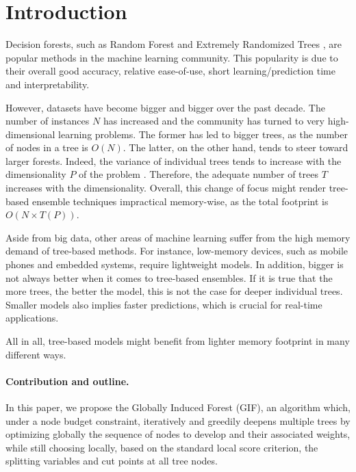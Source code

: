 \documentclass{article}
\begin{document}
\section{Introduction}
\label{sec:introduction}

Decision forests, such as Random Forest \cite{breiman2001random} and
Extremely Randomized Trees \cite{extratrees}, are popular methods in
the machine learning community. This popularity is due to their
overall good accuracy, relative ease-of-use, short learning/prediction
time and interpretability. 

However, datasets have become bigger and bigger over the past decade. The 
number of instances $N$ has increased and the community has turned to very 
high-dimensional learning problems. The former has led to bigger trees, as the 
number of nodes in a tree is $O(N)$. The latter, on the other hand, tends to 
steer toward larger forests. Indeed, the variance of individual trees tends to 
increase with the dimensionality $P$ of the problem \cite{l1basedcomp}. 
Therefore, the adequate number of trees $T$ increases with the dimensionality. 
Overall, this change of focus might render tree-based ensemble techniques 
impractical memory-wise, as the total footprint is $O(N \times T(P))$. 

Aside from big data, other areas of machine learning suffer from the
high memory demand of tree-based methods. For instance, low-memory
devices, such as mobile phones and embedded systems, require
lightweight models. In addition, bigger is not always better when it
comes to tree-based ensembles.  If it is true that the more trees, the
better the model, this is not the case for deeper individual trees.
Smaller models also implies faster predictions, which is crucial for
real-time applications.

All in all, tree-based models might benefit from lighter memory
footprint in many different ways.

\vspace*{-\baselineskip}

\paragraph{Contribution and outline.}
In this paper, we propose the Globally Induced Forest (GIF), an algorithm 
which, under a node budget constraint, iteratively and greedily deepens 
multiple 
trees by optimizing globally the sequence of nodes to develop and their 
associated weights, while still choosing locally, based on the standard local 
score criterion, the splitting variables and cut points at all tree nodes. 
\end{document}
